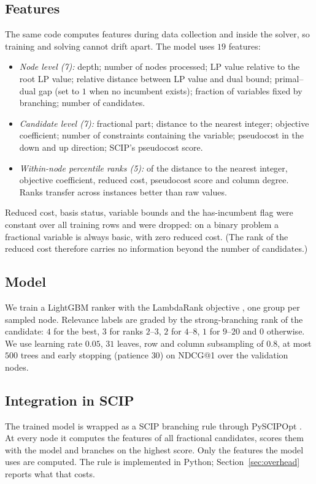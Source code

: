 \documentclass[11pt,a4paper]{article}
\begin{document}
\subsection{Features}\label{sec:features}
The same code computes features during data collection and inside the solver, so training and solving cannot drift apart. The model uses $19$ features:
\begin{itemize}
  \item \emph{Node level (7):} depth; number of nodes processed; LP value relative to the root LP value; relative distance between LP value and dual bound; primal--dual gap (set to $1$ when no incumbent exists); fraction of variables fixed by branching; number of candidates.
  \item \emph{Candidate level (7):} fractional part; distance to the nearest integer; objective coefficient; number of constraints containing the variable; pseudocost in the down and up direction; SCIP's pseudocost score.
  \item \emph{Within-node percentile ranks (5):} of the distance to the nearest integer, objective coefficient, reduced cost, pseudocost score and column degree. Ranks transfer across instances better than raw values.
\end{itemize}
Reduced cost, basis status, variable bounds and the has-incumbent flag were constant over all training rows and were dropped: on a binary problem a fractional variable is always basic, with zero reduced cost. (The rank of the reduced cost therefore carries no information beyond the number of candidates.)
 
\subsection{Model}
We train a LightGBM \citep{ke2017lightgbm} ranker with the LambdaRank objective \citep{burges2010ranknet}, one group per sampled node. Relevance labels are graded by the strong-branching rank of the candidate: $4$ for the best, $3$ for ranks $2$--$3$, $2$ for $4$--$8$, $1$ for $9$--$20$ and $0$ otherwise. We use learning rate $0.05$, $31$ leaves, row and column subsampling of $0.8$, at most $500$ trees and early stopping (patience $30$) on NDCG@1 over the validation nodes.
 
\subsection{Integration in SCIP}
The trained model is wrapped as a SCIP branching rule through PySCIPOpt \citep{maher2016pyscipopt}. At every node it computes the features of all fractional candidates, scores them with the model and branches on the highest score. Only the features the model uses are computed. The rule is implemented in Python; Section~\ref{sec:overhead} reports what that costs.
 
\end{document}
